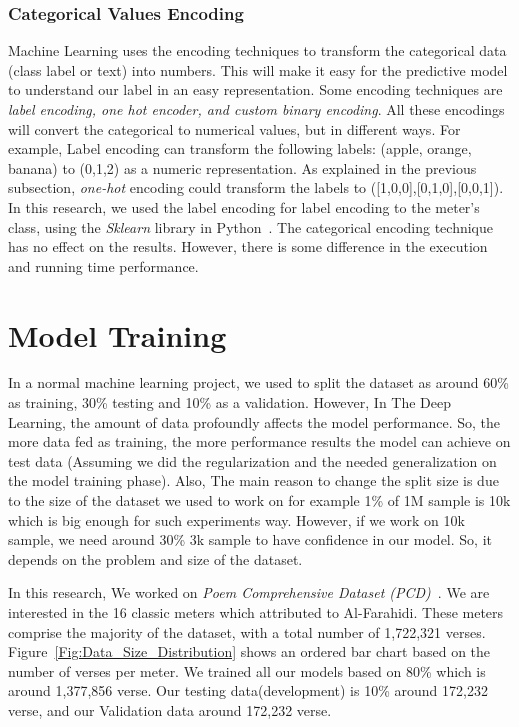 \subsubsection{Categorical Values Encoding}\label{sec:label_encoder}

Machine Learning uses the encoding techniques to transform the categorical data (class label or text) into numbers. 
This will make it easy for the predictive model to understand our label in an easy representation. 
Some encoding techniques are \textit{label encoding, one hot encoder, and custom \textit{binary} encoding}. 
All these encodings will convert the categorical to numerical values, but in different ways. 
For example, Label encoding can transform the following labels: (apple, orange, banana) to (0,1,2) as a numeric representation. 
As explained in the previous subsection, \textit{one-hot} encoding could transform the labels to ([1,0,0],[0,1,0],[0,0,1]). 
In this research, we used the label encoding for label encoding to the meter’s class, using the \textit{Sklearn} library in Python~\cite{scikit-learn}. The categorical encoding technique has no effect on the results. However, there is some difference in the execution and running time performance.

\clearpage

\section{Model Training}
In a normal machine learning project, we used to split the dataset as around 60\% as training, 30\% testing and 10\% as a validation. However, In The Deep Learning, the amount of data profoundly affects the model performance. So, the more data fed as training, the more performance results the model can achieve on test data (Assuming we did the regularization and the needed generalization on the model training phase). Also, The main reason to change the split size is due to the size of the dataset we used to work on for example 1\% of 1M sample is 10k which is big enough for such experiments way. However, if we work on 10k sample, we need around 30\% 3k sample to have confidence in our model. So, it depends on the problem and size of the dataset.

In this research, We worked on \textit{Poem Comprehensive Dataset (PCD)}~\cite{ArabicpoetryDS}. We are interested in the 16 classic meters which attributed to Al-Farahidi. These meters comprise the majority of the dataset, with a total number of 1,722,321 verses. Figure~\ref{Fig:Data_Size_Distribution} shows an ordered bar chart based on the number of verses per meter. We trained all our models based on 80\% which is around 1,377,856 verse. Our testing data(development) is 10\% around 172,232 verse, and our Validation data around 172,232 verse.

